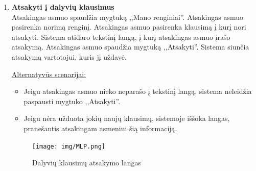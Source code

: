 \documentclass{VUMIFPSkursinis}
\begin{document}
\begin{enumerate} [label = \textbf{U\arabic*.}]
				\begin{figure}[H]
					\centering
					\texttt{[image: img/MLP.png]}
					\caption{Atsakingo asmens pasiūlymų valdymo langas}
					\label{fig:pasiulymu-sarasas}
				\end{figure}
			
			\item \textbf{Atsakyti į dalyvių klausimus}   \\
					Atsakingas asmuo spaudžia mygtuką ,,Mano renginiai''. 
					Atsakingas asmuo pasirenka norimą renginį.
					Atsakingas asmuo pasirenka klausimą į kurį nori atsakyti. 
					Sistema atidaro tekstinį langą, į kurį atsakingas asmuo įrašo atsakymą. 
					Atsakingas asmuo spaudžia mygtuką ,,Atsakyti''.
					Sistema siunčia atsakymą vartotojui, kuris jį uždavė.
					
					\underline{Alternatyvūs scenarijai:}
					\begin{itemize}
						\item Jeigu atsakingas asmuo nieko neparašo į tekstinį langą, sistema neleidžia paspausti mygtuko ,,Atsakyti''.
						\item Jeigu nėra užduota jokių naujų klausimų, sistemoje iššoka langas, pranešantis atsakingam asmeniui šią informaciją.
					\end{itemize}
				
				\begin{figure}[H]
					\centering
					\texttt{[image: img/MLP.png]}
					\caption{Dalyvių klausimų atsakymo langas}
					\label{fig:atsakyti-klausimus}
				\end{figure}


\end{enumerate}
\end{document}
